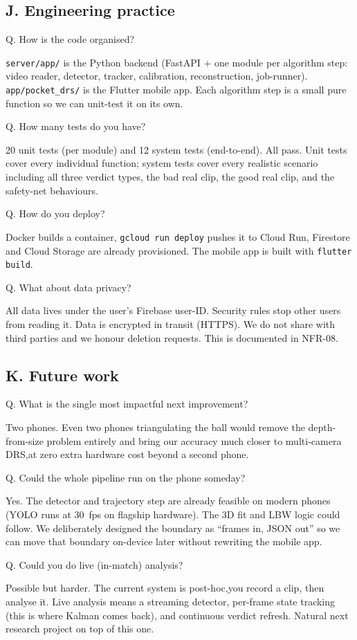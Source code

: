 \documentclass[11pt,a4paper]{article}
\newcommand{\qa}[2]{%
  \par\vspace{8pt}%
  \noindent
  \colorbox{NavyTint}{%
    \begin{minipage}{\dimexpr\textwidth-2\fboxsep\relax}%
      \color{white}\bfseries\strut Q. #1%
    \end{minipage}%
  }\par\nobreak
  \noindent
  \colorbox{MutedBg}{%
    \begin{minipage}{\dimexpr\textwidth-2\fboxsep\relax}%
      \color{black}\setlength{\parskip}{4pt}\strut #2\strut%
    \end{minipage}%
  }%
  \par\vspace{6pt}%
}
\begin{document}
\subsection{J. Engineering practice}

\qa{How is the code organised?}{%
\texttt{server/app/} is the Python backend (FastAPI + one module per algorithm step: video reader, detector, tracker, calibration, reconstruction, job-runner). \texttt{app/pocket\_drs/} is the Flutter mobile app. Each algorithm step is a small pure function so we can unit-test it on its own.}

\qa{How many tests do you have?}{%
20 unit tests (per module) and 12 system tests (end-to-end). All pass. Unit tests cover every individual function; system tests cover every realistic scenario including all three verdict types, the bad real clip, the good real clip, and the safety-net behaviours.}

\qa{How do you deploy?}{%
Docker builds a container, \texttt{gcloud run deploy} pushes it to Cloud Run, Firestore and Cloud Storage are already provisioned. The mobile app is built with \texttt{flutter build}.}

\qa{What about data privacy?}{%
All data lives under the user's Firebase user-ID. Security rules stop other users from reading it. Data is encrypted in transit (HTTPS). We do not share with third parties and we honour deletion requests. This is documented in NFR-08.}

\subsection{K. Future work}

\qa{What is the single most impactful next improvement?}{%
Two phones. Even two phones triangulating the ball would remove the depth-from-size problem entirely and bring our accuracy much closer to multi-camera DRS,at zero extra hardware cost beyond a second phone.}

\qa{Could the whole pipeline run on the phone someday?}{%
Yes. The detector and trajectory step are already feasible on modern phones (YOLO runs at 30~fps on flagship hardware). The 3D fit and LBW logic could follow. We deliberately designed the boundary as ``frames in, JSON out'' so we can move that boundary on-device later without rewriting the mobile app.}

\qa{Could you do live (in-match) analysis?}{%
Possible but harder. The current system is post-hoc,you record a clip, then analyse it. Live analysis means a streaming detector, per-frame state tracking (this is where Kalman comes back), and continuous verdict refresh. Natural next research project on top of this one.}
\end{document}
